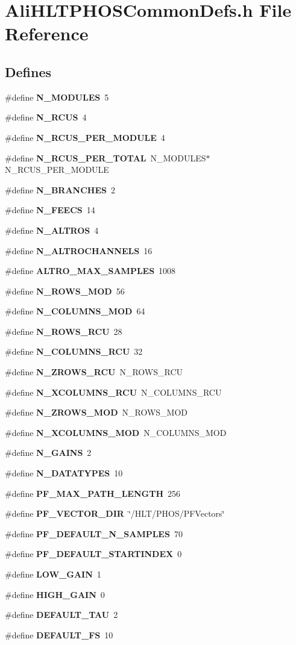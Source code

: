 \section{Ali\-HLTPHOSCommon\-Defs.h File Reference}
\label{AliHLTPHOSCommonDefs_8h}


\subsection*{Defines}
\begin{CompactItemize}
\item 
\#define {\bf N\_\-MODULES}\ 5
\item 
\#define {\bf N\_\-RCUS}\ 4
\item 
\#define {\bf N\_\-RCUS\_\-PER\_\-MODULE}\ 4
\item 
\#define {\bf N\_\-RCUS\_\-PER\_\-TOTAL}\ N\_\-MODULES$\ast$N\_\-RCUS\_\-PER\_\-MODULE
\item 
\#define {\bf N\_\-BRANCHES}\ 2
\item 
\#define {\bf N\_\-FEECS}\ 14
\item 
\#define {\bf N\_\-ALTROS}\ 4
\item 
\#define {\bf N\_\-ALTROCHANNELS}\ 16
\item 
\#define {\bf ALTRO\_\-MAX\_\-SAMPLES}\ 1008
\item 
\#define {\bf N\_\-ROWS\_\-MOD}\ 56
\item 
\#define {\bf N\_\-COLUMNS\_\-MOD}\ 64
\item 
\#define {\bf N\_\-ROWS\_\-RCU}\ 28
\item 
\#define {\bf N\_\-COLUMNS\_\-RCU}\ 32
\item 
\#define {\bf N\_\-ZROWS\_\-RCU}\ N\_\-ROWS\_\-RCU
\item 
\#define {\bf N\_\-XCOLUMNS\_\-RCU}\ N\_\-COLUMNS\_\-RCU
\item 
\#define {\bf N\_\-ZROWS\_\-MOD}\ N\_\-ROWS\_\-MOD
\item 
\#define {\bf N\_\-XCOLUMNS\_\-MOD}\ N\_\-COLUMNS\_\-MOD
\item 
\#define {\bf N\_\-GAINS}\ 2
\item 
\#define {\bf N\_\-DATATYPES}\ 10
\item 
\#define {\bf PF\_\-MAX\_\-PATH\_\-LENGTH}\ 256
\item 
\#define {\bf PF\_\-VECTOR\_\-DIR}\ \char`\"{}/HLT/PHOS/PFVectors\char`\"{}
\item 
\#define {\bf PF\_\-DEFAULT\_\-N\_\-SAMPLES}\ 70
\item 
\#define {\bf PF\_\-DEFAULT\_\-STARTINDEX}\ 0
\item 
\#define {\bf LOW\_\-GAIN}\ 1
\item 
\#define {\bf HIGH\_\-GAIN}\ 0
\item 
\#define {\bf DEFAULT\_\-TAU}\ 2
\item 
\#define {\bf DEFAULT\_\-FS}\ 10
\end{CompactItemize}


